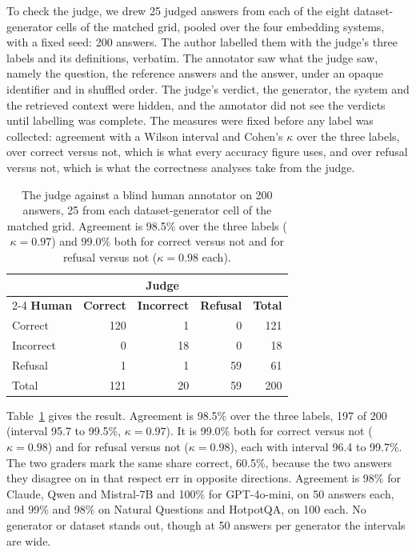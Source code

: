 \documentclass[11pt]{article}
\begin{document}
To check the judge, we drew 25 judged answers from each of the eight dataset-generator cells of the matched grid, pooled over the four embedding systems, with a fixed seed: 200 answers. The author labelled them with the judge's three labels and its definitions, verbatim. The annotator saw what the judge saw, namely the question, the reference answers and the answer, under an opaque identifier and in shuffled order. The judge's verdict, the generator, the system and the retrieved context were hidden, and the annotator did not see the verdicts until labelling was complete. The measures were fixed before any label was collected: agreement with a Wilson interval and Cohen's $\kappa$ over the three labels, over correct versus not, which is what every accuracy figure uses, and over refusal versus not, which is what the correctness analyses take from the judge.

\begin{table}[t]
\centering
\small
\begin{tabular}{lrrrr}
\toprule
 & \multicolumn{3}{c}{\textbf{Judge}} & \\
\cmidrule(lr){2-4}
\textbf{Human} & \textbf{Correct} & \textbf{Incorrect} & \textbf{Refusal} & \textbf{Total} \\
\midrule
Correct & 120 & 1 & 0 & 121 \\
Incorrect & 0 & 18 & 0 & 18 \\
Refusal & 1 & 1 & 59 & 61 \\
\midrule
Total & 121 & 20 & 59 & 200 \\
\bottomrule
\end{tabular}
\caption{The judge against a blind human annotator on 200 answers, 25 from each dataset-generator cell of the matched grid. Agreement is 98.5\% over the three labels ($\kappa = 0.97$) and 99.0\% both for correct versus not and for refusal versus not ($\kappa = 0.98$ each).}
\label{tab:human}
\end{table}

Table~\ref{tab:human} gives the result. Agreement is 98.5\% over the three labels, 197 of 200 (interval 95.7 to 99.5\%, $\kappa = 0.97$). It is 99.0\% both for correct versus not ($\kappa = 0.98$) and for refusal versus not ($\kappa = 0.98$), each with interval 96.4 to 99.7\%. The two graders mark the same share correct, 60.5\%, because the two answers they disagree on in that respect err in opposite directions. Agreement is 98\% for Claude, Qwen and Mistral-7B and 100\% for GPT-4o-mini, on 50 answers each, and 99\% and 98\% on Natural Questions and HotpotQA, on 100 each. No generator or dataset stands out, though at 50 answers per generator the intervals are wide.
\end{document}
